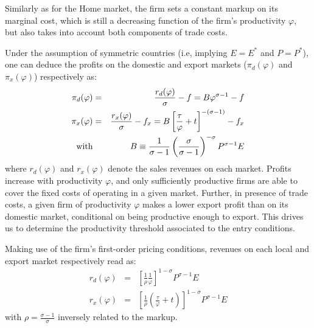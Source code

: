 \documentclass[a4paper,11pt]{article}
\begin{document}
Similarly as for the Home market, the firm sets a constant markup on its marginal cost, which is still a decreasing function of the firm's productivity $\varphi$, but also takes into account both components of trade costs.

Under the assumption of symmetric countries (i.e, implying $E=E^\ast$ and $P=P^\ast$), one can deduce the profits on the domestic and export markets ($\pi_d(\varphi)$ and $\pi_x(\varphi)$) respectively as:
\begin{eqnarray}
\pi_d(\varphi)  &=& \frac{r_d(\varphi)}{\sigma} - f = B \varphi^{\sigma-1} - f \label{eq:pid_rd}\\
\pi_x(\varphi) &=& \frac{r_x(\varphi)}{\sigma} - f_x = B \left[ \frac{\tau}{\varphi} + t\right]^{-(\sigma-1)} - f_x \label{eq:pix_rx}\\
\text{with}&& B \equiv \frac{1}{\sigma-1}\left(\frac{\sigma}{\sigma-1}\right)^{-\sigma}P^{\sigma-1}E \notag
\end{eqnarray}
\noindent where $r_d(\varphi)$ and $r_x(\varphi)$ denote the sales revenues on each market. Profits increase with productivity $\varphi$, and only sufficiently productive firms are able to cover the fixed costs of operating in a given market. Further, in presence of trade costs, a given firm of productivity $\varphi$ makes a lower export profit than on its domestic market, conditional on being productive enough to export. This drives us to determine the productivity threshold associated to the entry conditions.


Making use of the firm's first-order pricing conditions, revenues on each local and export market respectively read as:
\begin{eqnarray}
  r_d(\varphi) &=& \left[\frac{1}{\rho } \frac{1}{\varphi}  \right]^{1-\sigma} P^{\sigma-1} E \label{eq:rd}\\
  r_x(\varphi) &=& \left[\frac{1}{\rho}\left(\frac{\tau}{\varphi} +t\right)  \right]^{1-\sigma} P^{\sigma-1} E \label{eq:rx}
\end{eqnarray}
\noindent with $\rho =  \frac{\sigma-1}{\sigma}$ inversely related to the markup.
\end{document}
